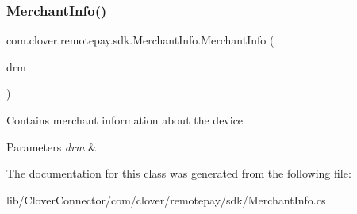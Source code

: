 \subsubsection{\texorpdfstring{Merchant\+Info()}{MerchantInfo()}\hspace{0.1cm}{\footnotesize\ttfamily [2/2]}}
{\footnotesize\ttfamily com.\+clover.\+remotepay.\+sdk.\+Merchant\+Info.\+Merchant\+Info (\begin{DoxyParamCaption}\item[{Discovery\+Response\+Message}]{drm }\end{DoxyParamCaption})}



Contains merchant information about the device 


\begin{DoxyParams}{Parameters}
{\em drm} & \\
\hline
\end{DoxyParams}


The documentation for this class was generated from the following file\+:\begin{DoxyCompactItemize}
\item 
lib/\+Clover\+Connector/com/clover/remotepay/sdk/Merchant\+Info.\+cs\end{DoxyCompactItemize}
